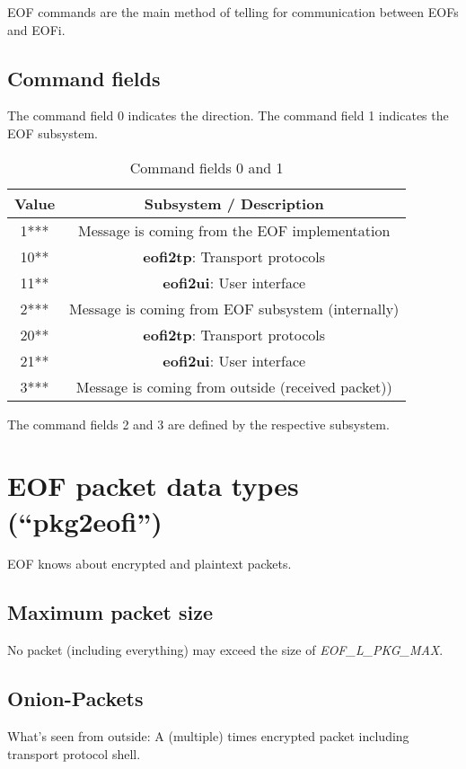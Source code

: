\documentclass[12pt,a4paper]{book}
\begin{document}
EOF commands are the main method of telling for communication between
EOFs and EOFi.
\subsection{Command fields}
The command field 0 indicates the direction.
The command field 1 indicates the EOF subsystem.
\begin{longtable}{|c|c|}
\caption{Command fields 0 and 1}\\
\hline
\textbf{Value} & \textbf{Subsystem} / \textbf{Description}\\
\hline
1*** & Message is coming from the EOF implementation\\
\hline
10** & \textbf{eofi2tp}: Transport protocols\\
\hline
11** & \textbf{eofi2ui}: User interface\\
\hline
2*** & Message is coming from EOF subsystem (internally)\\
\hline
20** & \textbf{eofi2tp}: Transport protocols\\
\hline
21** & \textbf{eofi2ui}: User interface\\
\hline
3*** & Message is coming from outside (received packet))\\
\hline
\end{longtable}
The command fields 2 and 3 are defined by the respective subsystem.
\section{EOF packet data types ("`pkg2eofi"')}
EOF knows about encrypted and plaintext packets. 
\subsection{Maximum packet size}
No packet (including everything) may exceed the size of
\emph{EOF\_L\_PKG\_MAX}.
\subsection{Onion-Packets}
What's seen from outside: A (multiple) times encrypted packet including
transport protocol shell.
\end{document}
